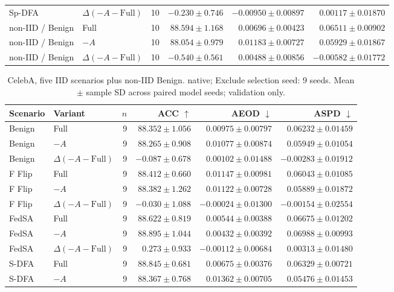 \begin{table}[t]
\begin{tabular}{llrrrr}
Sp-DFA & $\Delta(-A-\mathrm{Full})$ & 10 & $-0.230 \pm 0.746$ & $-0.00950 \pm 0.00897$ & $0.00117 \pm 0.01870$ \\
non-IID / Benign & Full & 10 & $88.594 \pm 1.168$ & $0.00696 \pm 0.00423$ & $0.06511 \pm 0.00902$ \\
non-IID / Benign & $-A$ & 10 & $88.054 \pm 0.979$ & $0.01183 \pm 0.00727$ & $0.05929 \pm 0.01867$ \\
non-IID / Benign & $\Delta(-A-\mathrm{Full})$ & 10 & $-0.540 \pm 0.561$ & $0.00488 \pm 0.00856$ & $-0.00582 \pm 0.01772$ \\
\bottomrule
\end{tabular}
\end{table}

\begin{table}[t]
\centering
\small
\caption{CelebA, five IID scenarios plus non-IID Benign. native; Exclude selection seed: 9 seeds. Mean $\pm$ sample SD across paired model seeds; validation only.}
\begin{tabular}{llrrrr}
\toprule
Scenario & Variant & $n$ & ACC $\uparrow$ & AEOD $\downarrow$ & ASPD $\downarrow$ \\
\midrule
Benign & Full & 9 & $88.352 \pm 1.056$ & $0.00975 \pm 0.00797$ & $0.06232 \pm 0.01459$ \\
Benign & $-A$ & 9 & $88.265 \pm 0.908$ & $0.01077 \pm 0.00874$ & $0.05949 \pm 0.01054$ \\
Benign & $\Delta(-A-\mathrm{Full})$ & 9 & $-0.087 \pm 0.678$ & $0.00102 \pm 0.01488$ & $-0.00283 \pm 0.01912$ \\
F Flip & Full & 9 & $88.412 \pm 0.660$ & $0.01147 \pm 0.00981$ & $0.06043 \pm 0.01085$ \\
F Flip & $-A$ & 9 & $88.382 \pm 1.262$ & $0.01122 \pm 0.00728$ & $0.05889 \pm 0.01872$ \\
F Flip & $\Delta(-A-\mathrm{Full})$ & 9 & $-0.030 \pm 1.088$ & $-0.00024 \pm 0.01300$ & $-0.00154 \pm 0.02554$ \\
FedSA & Full & 9 & $88.622 \pm 0.819$ & $0.00544 \pm 0.00388$ & $0.06675 \pm 0.01202$ \\
FedSA & $-A$ & 9 & $88.895 \pm 1.044$ & $0.00432 \pm 0.00392$ & $0.06988 \pm 0.00993$ \\
FedSA & $\Delta(-A-\mathrm{Full})$ & 9 & $0.273 \pm 0.933$ & $-0.00112 \pm 0.00684$ & $0.00313 \pm 0.01480$ \\
S-DFA & Full & 9 & $88.845 \pm 0.681$ & $0.00675 \pm 0.00376$ & $0.06329 \pm 0.00721$ \\
S-DFA & $-A$ & 9 & $88.367 \pm 0.768$ & $0.01362 \pm 0.00705$ & $0.05476 \pm 0.01453$ \\

\end{tabular}
\end{table}
